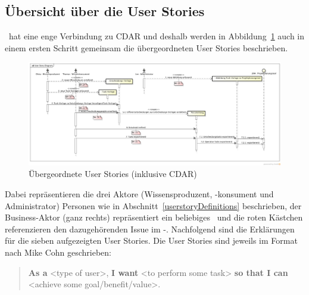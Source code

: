 		
	\begin{landscape}
	\subsection{Übersicht über die User Stories}
	
		\eeppi\ hat eine enge Verbindung zu CDAR und deshalb werden in Abbildung~\ref{fig:UserStoryDiagram} auch in einem ersten Schritt gemeinsam die übergeordneten User Stories beschrieben.
	
		\begin{figure}[H]
				\includegraphics[width=0.95\linewidth]{media/diagrams/UserStoryDiagram.png}
				\centering
				\caption{Übergeordnete User Stories (inklusive CDAR)}
				\label{fig:UserStoryDiagram}
		\end{figure}
		
		Dabei repräsentieren die drei Aktore (Wissensproduzent, -konsument und Administrator) Personen wie in Abschnitt~\ref{userstoryDefinitions} beschrieben,
		der Business-Aktor (ganz rechts) repräsentiert ein beliebiges \ppt\ und die roten Kästchen referenzieren den dazugehörenden Issue im \eeppi-\ppt.
		Nachfolgend sind die Erklärungen für die sieben aufgezeigten User Stories.
		Die User Stories sind jeweils im Format nach Mike Cohn\cite{rasmusson_agile_2012} geschrieben:
		\begin{quote}
			\textbf{As a} <type of user>,\newline
			\textbf{I want} <to perform some task>\newline
			\textbf{so that I can} <achieve some goal/benefit/value>.
		\end{quote}
	\end{landscape}
	
		
			
		
			